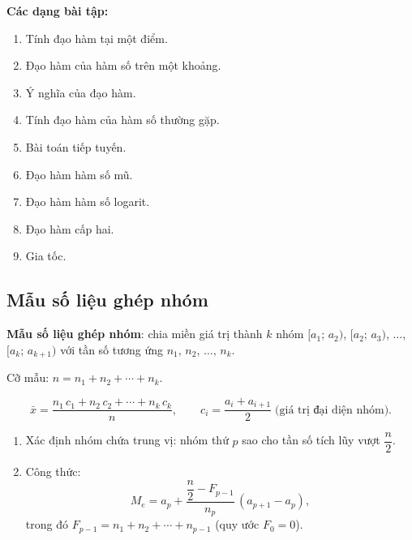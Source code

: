 \documentclass[12pt,a4paper]{article}
\begin{document}
\medskip\noindent\textbf{Các dạng bài tập:}
\begin{enumerate}[label=\textbf{Dạng \arabic*:}, leftmargin=*, align=left]
  \item Tính đạo hàm tại một điểm.
  \item Đạo hàm của hàm số trên một khoảng.
  \item Ý nghĩa của đạo hàm.
  \item Tính đạo hàm của hàm số thường gặp.
  \item Bài toán tiếp tuyến.
  \item Đạo hàm hàm số mũ.
  \item Đạo hàm hàm số logarit.
  \item Đạo hàm cấp hai.
  \item Gia tốc.
\end{enumerate}

\subsection{Mẫu số liệu ghép nhóm}

\begin{dinhnghia}
  \textbf{Mẫu số liệu ghép nhóm}: chia miền giá trị thành $k$ nhóm
  $[a_1;\,a_2)$, $[a_2;\,a_3)$, $\ldots$, $[a_k;\,a_{k+1})$
  với tần số tương ứng $n_1,\, n_2,\, \ldots,\, n_k$.

  \medskip
  Cỡ mẫu: $n = n_1 + n_2 + \cdots + n_k$.
\end{dinhnghia}

\begin{congthuc}[title={Số trung bình}]
  \[
    \bar{x} = \dfrac{n_1\,c_1 + n_2\,c_2 + \cdots + n_k\,c_k}{n},
    \qquad c_i = \dfrac{a_i + a_{i+1}}{2} \;\text{(giá trị đại diện nhóm)}.
  \]
\end{congthuc}

\begin{congthuc}[title={Trung vị $M_e$}]
  \begin{enumerate}
    \item Xác định nhóm chứa trung vị: nhóm thứ $p$ sao cho tần số tích lũy vượt $\dfrac{n}{2}$.
    \item Công thức:
      \[
        M_e = a_p + \dfrac{\dfrac{n}{2} - F_{p-1}}{n_p}\,(a_{p+1} - a_p),
      \]
      trong đó $F_{p-1} = n_1 + n_2 + \cdots + n_{p-1}$ \;(quy ước $F_0 = 0$).
  \end{enumerate}
\end{congthuc}
\end{document}
